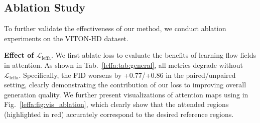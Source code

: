 \begin{table}[!t]
\centering
\setlength{\tabcolsep}{0.3cm}
\caption{Applying our \leffa{} loss $\mathcal{L}_\text{leffa}$ consistently enhances performance across different diffusion-based methods.}
\label{leffa:tab:general}
\end{table}


\subsection{Ablation Study}
\label{leffa:sec:ablation}

To further validate the effectiveness of our method, we conduct ablation experiments on the VITON-HD dataset.

\noindent \textbf{Effect of $\mathcal{L}_{\text{leffa}}$}.
We first ablate \leffa{} loss to evaluate the benefits of learning flow fields in attention.
As shown in Tab.~\ref{leffa:tab:general}, all metrics degrade without $\mathcal{L}_{\text{leffa}}$.
Specifically, the FID worsens by +0.77/+0.86 in the paired/unpaired setting, clearly demonstrating the contribution of our \leffa{} loss to improving overall generation quality.
We further present visualizations of attention maps using \leffa{} in Fig.~\ref{leffa:fig:vis_ablation}, which clearly show that the attended regions (highlighted in red) accurately correspond to the desired reference regions.

